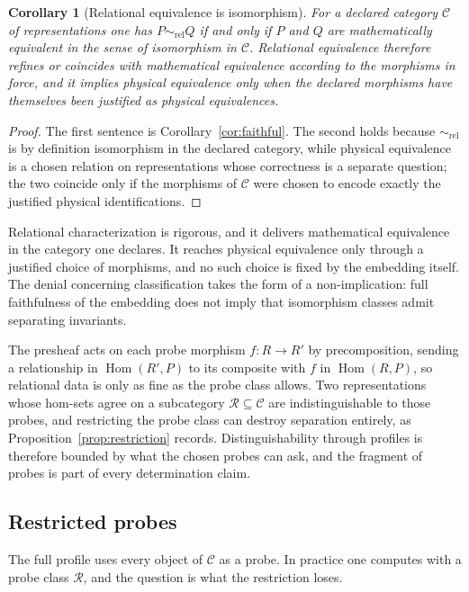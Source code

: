 \documentclass[11pt,letterpaper]{article}
\DeclareMathOperator{\Hom}{Hom}
\newtheorem{corollary}[theorem]{Corollary}
\theoremstyle{definition}
\theoremstyle{remark}
\begin{document}
\begin{corollary}[Relational equivalence is isomorphism]
\label{cor:releq}
For a declared category $\mathcal{C}$ of representations one has $P \sim_{\mathrm{rel}} Q$ if and only if $P$ and $Q$ are mathematically equivalent in the sense of isomorphism in $\mathcal{C}$. Relational equivalence therefore refines or coincides with mathematical equivalence according to the morphisms in force, and it implies physical equivalence only when the declared morphisms have themselves been justified as physical equivalences.
\end{corollary}

\begin{proof}
The first sentence is Corollary~\ref{cor:faithful}. The second holds because $\sim_{\mathrm{rel}}$ is by definition isomorphism in the declared category, while physical equivalence is a chosen relation on representations whose correctness is a separate question; the two coincide only if the morphisms of $\mathcal{C}$ were chosen to encode exactly the justified physical identifications.
\end{proof}

Relational characterization is rigorous, and it delivers mathematical equivalence in the category one declares. It reaches physical equivalence only through a justified choice of morphisms, and no such choice is fixed by the embedding itself. The denial concerning classification takes the form of a non-implication: full faithfulness of the embedding does not imply that isomorphism classes admit separating invariants.

The presheaf acts on each probe morphism $f \colon R \to R'$ by precomposition, sending a relationship in $\Hom(R', P)$ to its composite with $f$ in $\Hom(R, P)$, so relational data is only as fine as the probe class allows. Two representations whose hom-sets agree on a subcategory $\mathcal{R} \subseteq \mathcal{C}$ are indistinguishable to those probes, and restricting the probe class can destroy separation entirely, as Proposition~\ref{prop:restriction} records. Distinguishability through profiles is therefore bounded by what the chosen probes can ask, and the fragment of probes is part of every determination claim.

\subsection{Restricted probes}
\label{sec:restricted}

The full profile uses every object of $\mathcal{C}$ as a probe. In practice one computes with a probe class $\mathcal{R}$, and the question is what the restriction loses.
\end{document}
